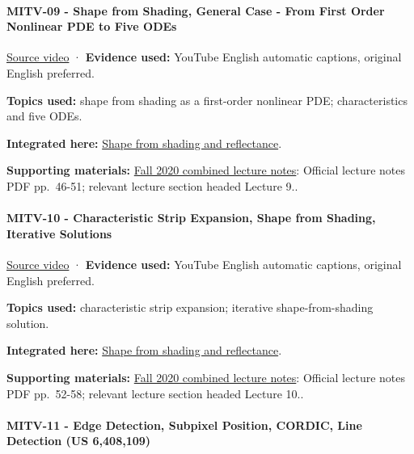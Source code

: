 \paragraph{MITV-09 - Shape from Shading, General Case - From First Order Nonlinear PDE to Five ODEs}\label{mitv-09---shape-from-shading-general-case---from-first-order-nonlinear-pde-to-five-odes}

\href{https://www.youtube.com/watch?v=J4gbaRyWpoM}{Source video} · \textbf{Evidence used:} YouTube English automatic captions, original English preferred.

\textbf{Topics used:} shape from shading as a first-order nonlinear PDE; characteristics and five ODEs.

\textbf{Integrated here:} \hyperref[04-visual-computing-ii-ch032]{Shape from shading and reflectance}.

\textbf{Supporting materials:} \href{https://ocw.mit.edu/courses/6-801-machine-vision-fall-2020/9ec44f69e72995c370b3797818ba01e6_MIT6_801F20_lectureNotes.pdf}{Fall 2020 combined lecture notes}: Official lecture notes PDF pp.~46-51; relevant lecture section headed Lecture 9..

\paragraph{MITV-10 - Characteristic Strip Expansion, Shape from Shading, Iterative Solutions}\label{mitv-10---characteristic-strip-expansion-shape-from-shading-iterative-solutions}

\href{https://www.youtube.com/watch?v=XSUjp-cDyeY}{Source video} · \textbf{Evidence used:} YouTube English automatic captions, original English preferred.

\textbf{Topics used:} characteristic strip expansion; iterative shape-from-shading solution.

\textbf{Integrated here:} \hyperref[04-visual-computing-ii-ch032]{Shape from shading and reflectance}.

\textbf{Supporting materials:} \href{https://ocw.mit.edu/courses/6-801-machine-vision-fall-2020/9ec44f69e72995c370b3797818ba01e6_MIT6_801F20_lectureNotes.pdf}{Fall 2020 combined lecture notes}: Official lecture notes PDF pp.~52-58; relevant lecture section headed Lecture 10..

\paragraph{MITV-11 - Edge Detection, Subpixel Position, CORDIC, Line Detection (US 6,408,109)}\label{mitv-11---edge-detection-subpixel-position-cordic-line-detection-us-6408109}

